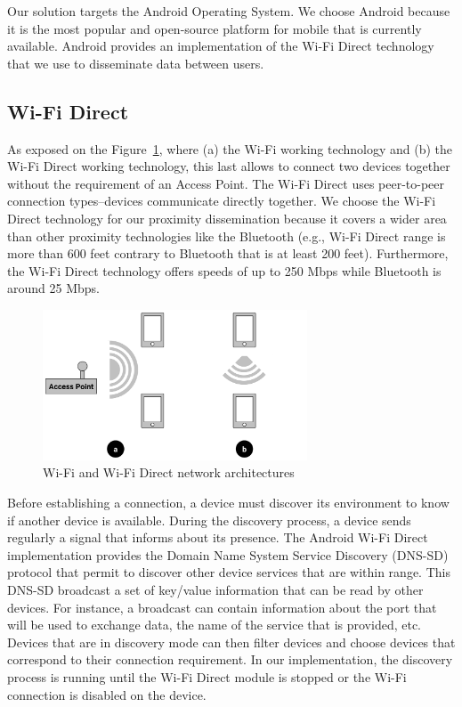 

Our solution targets the Android Operating System.
We choose Android because it is the most popular and open-source platform for mobile that is currently available.
Android provides an implementation of the Wi-Fi Direct technology that we use to disseminate data between users.

\subsection{Wi-Fi Direct}

As exposed on the Figure~\ref{WiFiVsWiFiDi}, where (a) the Wi-Fi working technology and (b) the Wi-Fi Direct working technology, this last allows to connect two devices together without the requirement of an Access Point.
The Wi-Fi Direct uses peer-to-peer connection types--devices communicate directly together.
We choose the Wi-Fi Direct technology for our proximity dissemination because it covers a wider area than other proximity technologies like the Bluetooth (e.g., Wi-Fi Direct range is more than 600 feet contrary to Bluetooth that is at least 200 feet).
Furthermore, the Wi-Fi Direct technology offers speeds of up to 250 Mbps while Bluetooth is around 25 Mbps.

\begin{figure}[h]
	\centering
	\includegraphics[width=0.7\textwidth]{figures/wifivswifidirect}
	\caption{\label{WiFiVsWiFiDi}Wi-Fi and Wi-Fi Direct network architectures}
\end{figure}

Before establishing a connection, a device must discover its environment to know if another device is available.
During the discovery process, a device sends regularly a signal that informs about its presence.
The Android Wi-Fi Direct implementation provides the Domain Name System Service Discovery (DNS-SD) protocol that permit to discover other device services that are within range.
This DNS-SD broadcast a set of key/value information that can be read by other devices.
For instance, a broadcast can contain information about the port that will be used to exchange data, the name of the service that is provided, etc.
Devices that are in discovery mode can then filter devices and choose devices that correspond to their connection requirement.
In our implementation, the discovery process is running until the Wi-Fi Direct module is stopped or the Wi-Fi connection is disabled on the device.

